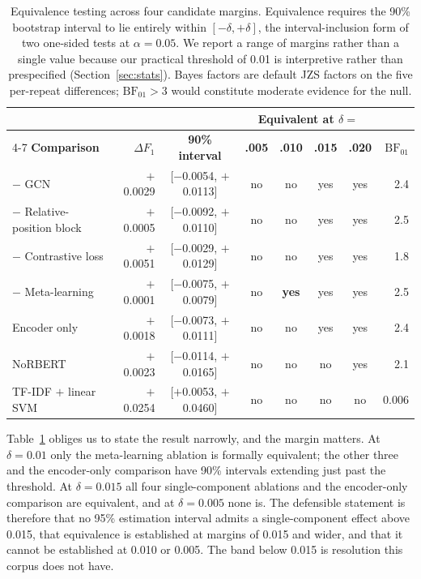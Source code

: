 \documentclass[11pt,a4paper]{article}
\begin{document}
\begin{table}[htbp]
\centering
\caption{Equivalence testing across four candidate margins. Equivalence requires the 90\%
bootstrap interval to lie entirely within $[-\delta, +\delta]$, the interval-inclusion form of
two one-sided tests at $\alpha = 0.05$. We report a range of margins rather than a single
value because our practical threshold of 0.01 is interpretive rather than prespecified
(Section~\ref{sec:stats}). Bayes factors are default JZS factors on the five per-repeat
differences; $\mathrm{BF}_{01} > 3$ would constitute moderate evidence for the null.}
\label{tab:equiv}
\small
\setlength{\tabcolsep}{5pt}
\begin{tabular}{@{}lrccccc r@{}}
\toprule
& & & \multicolumn{4}{c}{\textbf{Equivalent at $\delta =$}} & \\
\cmidrule(lr){4-7}
\textbf{Comparison} & \textbf{$\Delta F_1$} & \textbf{90\% interval} & \textbf{.005} & \textbf{.010} & \textbf{.015} & \textbf{.020} & \textbf{$\mathrm{BF}_{01}$}\\
\midrule
$-$ GCN & $+$0.0029 & [$-$0.0054, $+$0.0113] & no & no & yes & yes & 2.4\\
$-$ Relative-position block & $+$0.0005 & [$-$0.0092, $+$0.0110] & no & no & yes & yes & 2.5\\
$-$ Contrastive loss & $+$0.0051 & [$-$0.0029, $+$0.0129] & no & no & yes & yes & 1.8\\
$-$ Meta-learning & $+$0.0001 & [$-$0.0075, $+$0.0079] & no & \textbf{yes} & yes & yes & 2.5\\
Encoder only & $+$0.0018 & [$-$0.0073, $+$0.0111] & no & no & yes & yes & 2.4\\
\midrule
NoRBERT & $+$0.0023 & [$-$0.0114, $+$0.0165] & no & no & no & yes & 2.1\\
TF-IDF $+$ linear SVM & $+$0.0254 & [$+$0.0053, $+$0.0460] & no & no & no & no & 0.006\\
\bottomrule
\end{tabular}
\setlength{\tabcolsep}{6pt}
\end{table}

Table~\ref{tab:equiv} obliges us to state the result narrowly, and the margin matters. At
$\delta = 0.01$ only the meta-learning ablation is formally equivalent; the other three and the
encoder-only comparison have 90\% intervals extending just past the threshold. At
$\delta = 0.015$ all four single-component ablations and the encoder-only comparison are
equivalent, and at $\delta = 0.005$ none is. The defensible statement is therefore that no
95\% estimation interval admits a single-component effect above 0.015, that equivalence is
established at margins of 0.015 and wider, and that it cannot be established at 0.010 or
0.005. The band below 0.015 is resolution this corpus does not have.
\end{document}
